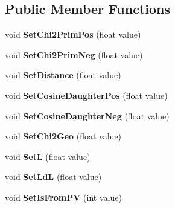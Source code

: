 \subsection*{Public Member Functions}
\begin{DoxyCompactItemize}
\item 
void {\bfseries Set\+Chi2\+Prim\+Pos} (float value)\hypertarget{classOutputContainer_ac4d391c8d0e0829b7fe98139d69d1c34}{}\label{classOutputContainer_ac4d391c8d0e0829b7fe98139d69d1c34}

\item 
void {\bfseries Set\+Chi2\+Prim\+Neg} (float value)\hypertarget{classOutputContainer_a7aa4aed0887a86310051de07d69b6e3d}{}\label{classOutputContainer_a7aa4aed0887a86310051de07d69b6e3d}

\item 
void {\bfseries Set\+Distance} (float value)\hypertarget{classOutputContainer_a099e2cd16afcf680eaaff61d5b4bb53f}{}\label{classOutputContainer_a099e2cd16afcf680eaaff61d5b4bb53f}

\item 
void {\bfseries Set\+Cosine\+Daughter\+Pos} (float value)\hypertarget{classOutputContainer_aed510ed8aee7697d492d1ecf74fc5712}{}\label{classOutputContainer_aed510ed8aee7697d492d1ecf74fc5712}

\item 
void {\bfseries Set\+Cosine\+Daughter\+Neg} (float value)\hypertarget{classOutputContainer_a993a441de2b692e0de01356d91a0778c}{}\label{classOutputContainer_a993a441de2b692e0de01356d91a0778c}

\item 
void {\bfseries Set\+Chi2\+Geo} (float value)\hypertarget{classOutputContainer_a8d9a1efd7061a91e5f3378ba76d32907}{}\label{classOutputContainer_a8d9a1efd7061a91e5f3378ba76d32907}

\item 
void {\bfseries SetL} (float value)\hypertarget{classOutputContainer_a62c277b1b9e522d2f1d2e794ae391fd7}{}\label{classOutputContainer_a62c277b1b9e522d2f1d2e794ae391fd7}

\item 
void {\bfseries Set\+LdL} (float value)\hypertarget{classOutputContainer_a26c4eb14351d27e738c93ef545db5926}{}\label{classOutputContainer_a26c4eb14351d27e738c93ef545db5926}

\item 
void {\bfseries Set\+Is\+From\+PV} (int value)\hypertarget{classOutputContainer_a05c849ca8032917d4b70bd751b2bf9ef}{}\label{classOutputContainer_a05c849ca8032917d4b70bd751b2bf9ef}


\end{DoxyCompactItemize}
